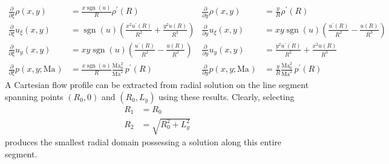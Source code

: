 \documentclass[letterpaper,11pt,nointlimits,reqno]{amsart}
\newcommand{\Mach}[1][]{\mbox{Ma}_{#1}}
\begin{document}
\begin{align}
  \frac{\partial}{\partial\xi} \rho \!\left(x, y\right)
&=
  \frac{x\operatorname{sgn}(u)}{R} \rho^\prime\!\left(R\right)
&
  \frac{\partial}{\partial{}y} \rho \!\left(x, y\right)
&=
  \frac{y                     }{R} \rho^\prime\!\left(R\right)
\\
  \frac{\partial}{\partial\xi} u_\xi\!\left(x, y\right)
&=
  \operatorname{sgn}(u) \left(
      \frac{x^2 u^\prime\!\left(R\right)}{R^2}
    + \frac{y^2 u       \!\left(R\right)}{R^3}
  \right)
&
  \frac{\partial}{\partial{}y} u_\xi\!\left(x, y\right)
&=
  x y \operatorname{sgn}(u) \left(
      \frac{u^\prime\!\left(R\right)}{R^2}
    - \frac{u       \!\left(R\right)}{R^3}
  \right)
\\
  \frac{\partial}{\partial\xi} u_y  \!\left(x, y\right)
&=
  x y \operatorname{sgn}(u) \left(
      \frac{u^\prime\!\left(R\right)}{R^2}
    - \frac{u       \!\left(R\right)}{R^3}
  \right)
&
  \frac{\partial}{\partial{}y} u_y  \!\left(x, y\right)
&=
    \frac{ y^2 u^\prime\!\left(R\right) }{ R^2 }
  + \frac{ x^2 u       \!\left(R\right) }{ R^3 }
\\
  \frac{\partial}{\partial\xi} p    \!\left(x, y; \Mach\right)
&=
  \frac{x\operatorname{sgn}(u)}{R}
  \frac{\Mach[0]^2}{\Mach^2}
  \,
  p^\prime\!\left(R\right)
&
  \frac{\partial}{\partial{}y} p    \!\left(x, y; \Mach\right)
&=
  \frac{y                     }{R}
  \frac{\Mach[0]^2}{\Mach^2}
  \,
  p^\prime\!\left(R\right)
\end{align}
%
A Cartesian flow profile can be extracted from radial solution on the line
segment spanning points $\left(R_0,0\right)$ and $\left(R_0,L_y\right)$ using
these results.  Clearly, selecting
\begin{align}
  R_1 &= R_0
\\
  R_2 &= \sqrt{R_0^2 + L_y^2}
\end{align}
produces the smallest radial domain possessing a solution along this entire
segment.
\end{document}
